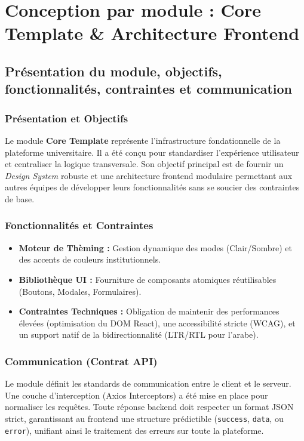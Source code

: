 \documentclass[12pt,a4paper]{report}
\begin{document}
\chapter{Conception par module : Core Template \& Architecture Frontend}

\section{Présentation du module, objectifs, fonctionnalités, contraintes et communication}

\subsection{Présentation et Objectifs}
Le module \textbf{Core Template} représente l'infrastructure fondationnelle de la plateforme universitaire. Il a été conçu pour standardiser l'expérience utilisateur et centraliser la logique transversale. Son objectif principal est de fournir un \textit{Design System} robuste et une architecture frontend modulaire permettant aux autres équipes de développer leurs fonctionnalités sans se soucier des contraintes de base.

\subsection{Fonctionnalités et Contraintes}
\begin{itemize}
    \item \textbf{Moteur de Thèming :} Gestion dynamique des modes (Clair/Sombre) et des accents de couleurs institutionnels.
    \item \textbf{Bibliothèque UI :} Fourniture de composants atomiques réutilisables (Boutons, Modales, Formulaires).
    \item \textbf{Contraintes Techniques :} Obligation de maintenir des performances élevées (optimisation du DOM React), une accessibilité stricte (WCAG), et un support natif de la bidirectionnalité (LTR/RTL pour l'arabe).
\end{itemize}

\subsection{Communication (Contrat API)}
Le module définit les standards de communication entre le client et le serveur. Une couche d'interception (Axios Interceptors) a été mise en place pour normaliser les requêtes. 
Toute réponse backend doit respecter un format JSON strict, garantissant au frontend une structure prédictible (\texttt{success}, \texttt{data}, ou \texttt{error}), unifiant ainsi le traitement des erreurs sur toute la plateforme.
\end{document}
